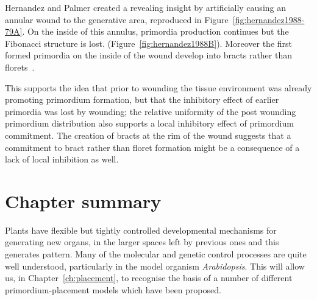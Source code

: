 

Hernandez and Palmer created a  revealing insight by artificially causing an annular wound to the generative area, reproduced in Figure~\ref{fig:hernandez1988-79A}\autocite{hernandezRegenerationSunflowerCapitulum1988}. On the inside of this annulus, primordia production continues but the Fibonacci structure is lost. (Figure~\ref{fig:hernandez1988B}). Moreover the first formed primordia on the inside of the wound develop into bracts rather than florets~\autocite{hernandezRegenerationSunflowerCapitulum1988}.%
{\autocite{hernandezRegenerationSunflowerCapitulum1988}}%

This supports the idea that prior to wounding the tissue environment was already promoting primordium formation, but that the inhibitory effect of earlier primordia was lost by wounding; the relative uniformity of the post wounding primordium distribution also supports a local inhibitory effect of primordium commitment. The creation of bracts at the rim of the wound suggests that a commitment to bract rather than floret formation might be a consequence of a lack of local inhibition as well. 


\clearpage
  \section{Chapter summary}
  Plants have flexible but tightly controlled developmental mechanisms for generating new organs, in the larger spaces left by previous ones and this generates pattern. Many of the molecular and genetic control processes are quite well understood, particularly in the model organism \textit{Arabidopsis}. This will allow us, in Chapter~\ref{ch:placement}, to recognise the basis of a number of different primordium-placement models which have been proposed. 
 

